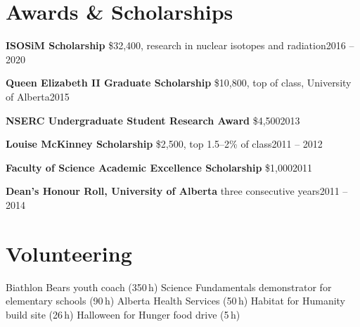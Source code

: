 \documentclass[11pt,letterpaper]{article}
\newcommand{\award}[3]{\textbf{#1}{\color{muted}\,\textendash\,#2}\hfill{\color{muted}#3}\par\vspace{2pt}}
\begin{document}
\section{Awards \& Scholarships}
\award{ISOSiM Scholarship}{\$32,400, research in nuclear isotopes and radiation}{2016 -- 2020}
\award{Queen Elizabeth II Graduate Scholarship}{\$10,800, top of class, University of Alberta}{2015}
\award{NSERC Undergraduate Student Research Award}{\$4,500}{2013}
\award{Louise McKinney Scholarship}{\$2,500, top 1.5--2\% of class}{2011 -- 2012}
\award{Faculty of Science Academic Excellence Scholarship}{\$1,000}{2011}
\award{Dean's Honour Roll, University of Alberta}{three consecutive years}{2011 -- 2014}

\section{Volunteering}
Biathlon Bears youth coach (350\,h) \textperiodcentered{}
Science Fundamentals demonstrator for elementary schools (90\,h) \textperiodcentered{}
Alberta Health Services (50\,h) \textperiodcentered{}
Habitat for Humanity build site (26\,h) \textperiodcentered{}
Halloween for Hunger food drive (5\,h)
\end{document}
